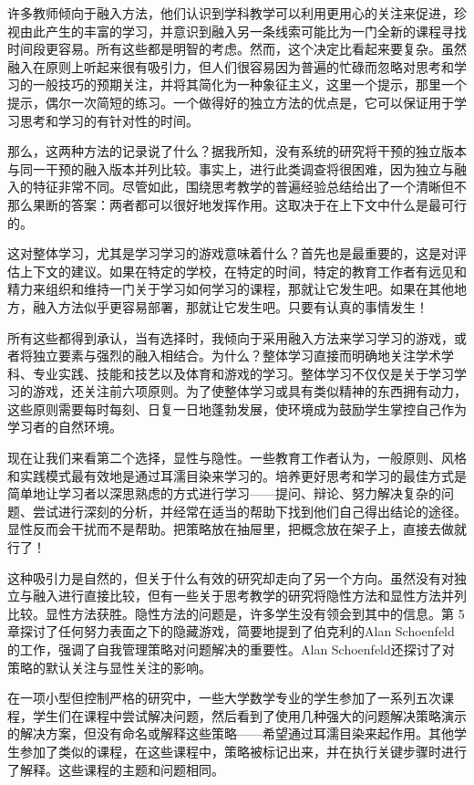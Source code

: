 许多教师倾向于融入方法，他们认识到学科教学可以利用更用心的关注来促进，珍视由此产生的丰富的学习，并意识到融入另一条线索可能比为一门全新的课程寻找时间段更容易。所有这些都是明智的考虑。然而，这个决定比看起来要复杂。虽然融入在原则上听起来很有吸引力，但人们很容易因为普遍的忙碌而忽略对思考和学习的一般技巧的预期关注，并将其简化为一种象征主义，这里一个提示，那里一个提示，偶尔一次简短的练习。一个做得好的独立方法的优点是，它可以保证用于学习思考和学习的有针对性的时间。

那么，这两种方法的记录说了什么？据我所知，没有系统的研究将干预的独立版本与同一干预的融入版本并列比较。事实上，进行此类调查将很困难，因为独立与融入的特征非常不同。尽管如此，围绕思考教学的普遍经验总结给出了一个清晰但不那么果断的答案：两者都可以很好地发挥作用。这取决于在上下文中什么是最可行的。

这对整体学习，尤其是学习学习的游戏意味着什么？首先也是最重要的，这是对评估上下文的建议。如果在特定的学校，在特定的时间，特定的教育工作者有远见和精力来组织和维持一门关于学习如何学习的课程，那就让它发生吧。如果在其他地方，融入方法似乎更容易部署，那就让它发生吧。只要有认真的事情发生！

所有这些都得到承认，当有选择时，我倾向于采用融入方法来学习学习的游戏，或者将独立要素与强烈的融入相结合。为什么？整体学习直接而明确地关注学术学科、专业实践、技能和技艺以及体育和游戏的学习。整体学习不仅仅是关于学习学习的游戏，还关注前六项原则。为了使整体学习或具有类似精神的东西拥有动力，这些原则需要每时每刻、日复一日地蓬勃发展，使环境成为鼓励学生掌控自己作为学习者的自然环境。

现在让我们来看第二个选择，显性与隐性。一些教育工作者认为，一般原则、风格和实践模式最有效地是通过耳濡目染来学习的。培养更好思考和学习的最佳方式是简单地让学习者以深思熟虑的方式进行学习——提问、辩论、努力解决复杂的问题、尝试进行深刻的分析，并经常在适当的帮助下找到他们自己得出结论的途径。显性反而会干扰而不是帮助。把策略放在抽屉里，把概念放在架子上，直接去做就行了！

这种吸引力是自然的，但关于什么有效的研究却走向了另一个方向。虽然没有对独立与融入进行直接比较，但有一些关于思考教学的研究将隐性方法和显性方法并列比较。显性方法获胜。隐性方法的问题是，许多学生没有领会到其中的信息。第 5 章探讨了任何努力表面之下的隐藏游戏，简要地提到了伯克利的Alan Schoenfeld的工作，强调了自我管理策略对问题解决的重要性。Alan Schoenfeld还探讨了对策略的默认关注与显性关注的影响。

在一项小型但控制严格的研究中，一些大学数学专业的学生参加了一系列五次课程，学生们在课程中尝试解决问题，然后看到了使用几种强大的问题解决策略演示的解决方案，但没有命名或解释这些策略——希望通过耳濡目染来起作用。其他学生参加了类似的课程，在这些课程中，策略被标记出来，并在执行关键步骤时进行了解释。这些课程的主题和问题相同。

